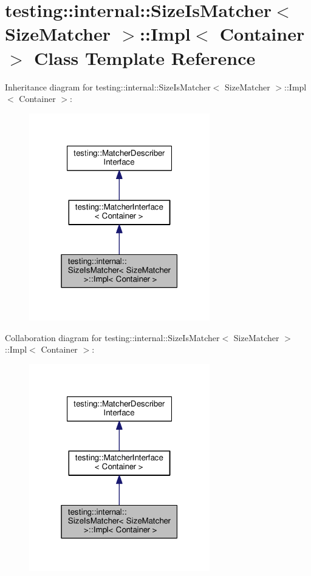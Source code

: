 \hypertarget{classtesting_1_1internal_1_1_size_is_matcher_1_1_impl}{}\section{testing\+:\+:internal\+:\+:Size\+Is\+Matcher$<$ Size\+Matcher $>$\+:\+:Impl$<$ Container $>$ Class Template Reference}
\label{classtesting_1_1internal_1_1_size_is_matcher_1_1_impl}


Inheritance diagram for testing\+:\+:internal\+:\+:Size\+Is\+Matcher$<$ Size\+Matcher $>$\+:\+:Impl$<$ Container $>$\+:
\nopagebreak
\begin{figure}[H]
\begin{center}
\leavevmode
\includegraphics[width=223pt]{classtesting_1_1internal_1_1_size_is_matcher_1_1_impl__inherit__graph}
\end{center}
\end{figure}


Collaboration diagram for testing\+:\+:internal\+:\+:Size\+Is\+Matcher$<$ Size\+Matcher $>$\+:\+:Impl$<$ Container $>$\+:
\nopagebreak
\begin{figure}[H]
\begin{center}
\leavevmode
\includegraphics[width=223pt]{classtesting_1_1internal_1_1_size_is_matcher_1_1_impl__coll__graph}
\end{center}
\end{figure}
